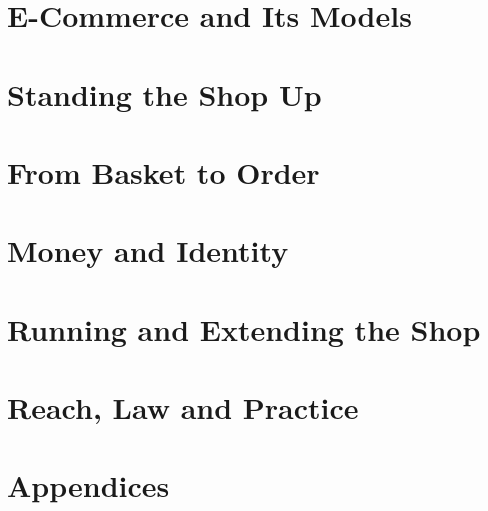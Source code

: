 \documentclass[11pt,a4paper,oneside]{report}
\begin{document}


\part{E-Commerce and Its Models}






\part{Standing the Shop Up}






\part{From Basket to Order}






\part{Money and Identity}






\part{Running and Extending the Shop}






\part{Reach, Law and Practice}





\appendix
\part*{Appendices}







\end{document}
